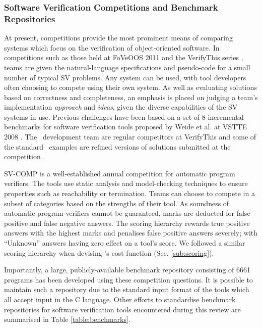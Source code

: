 \subsubsection{Software Verification Competitions and Benchmark Repositories}
\label{sub:lrsvmmbench}

At present, competitions provide the most prominent means of comparing systems which focus on the verification of object-oriented software. 
In competitions such as those held at FoVeOOS 2011 \cite{bormer:hal-00789525} and the VerifyThis series \cite{Huisman2015}, teams are given the natural-language specifications and pseudo-code for a small number of typical SV problems. 
Any system can be used, with tool developers often choosing to compete using their own system. 
As well as evaluating solutions based on correctness and completeness, an emphasis is placed on judging a team's implementation \textit{approach} and \textit{ideas}, given the diverse capabilities of the SV systems in use. 
Previous challenges have been based on a set of 8 incremental benchmarks for software verification tools proposed by Weide et al. at VSTTE 2008 \cite{Weide2008}. The \why~development team are regular competitors at VerifyThis and some of the standard \why~examples are refined versions of solutions submitted at the competition \cite{verifythis}.  


SV-COMP \cite{Beyer2016, SVCOMP} is a well-established annual competition for automatic program verifiers. 
The tools use static analysis and model-checking techniques to ensure properties such as reachability or termination. 
Teams can choose to compete in a subset of categories based on the strengths of their tool. 
As soundness of automatic program verifiers cannot be guaranteed, marks are deducted for false positive and false negative answers. 
The scoring hierarchy rewards true positive answers with the highest marks and penalises false positive answers severely; with ``Unknown'' answers having zero effect on a tool's score.
We followed a similar scoring hierarchy when devising \where's cost function (Sec. \ref{sub:scoring}).
 
Importantly, a large, publicly-available benchmark repository consisting of 6661 programs  has been developed using these competition questions. It is possible to maintain such a repository due to the standard input format of the tools which all accept input in the C language. Other efforts to standardise benchmark repositories for software verification tools encountered during this review are
summarised in Table \ref{table:benchmarks}.  

